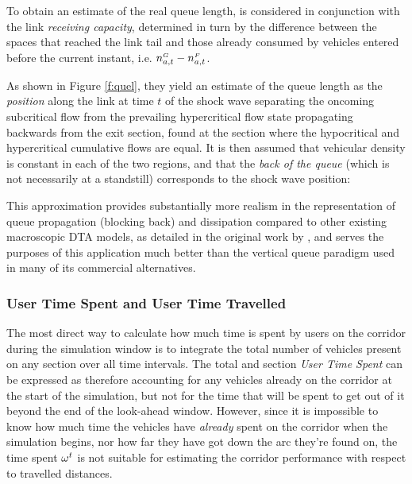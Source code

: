 To obtain an estimate of the real queue length,  is considered in conjunction with the link \emph{receiving capacity}, determined in turn by the difference between the spaces that reached the link tail and those already consumed by vehicles entered before the current instant, i.e. $n_{a,t}^{\scriptscriptstyle{G}} - n_{a,t}^{\scriptscriptstyle{F}}$. 


As shown in Figure \ref{f:quel}, they yield an estimate of the queue length as the \emph{position} along the link at time $t$ of the shock wave separating the oncoming subcritical flow from the prevailing hypercritical flow state propagating backwards from the exit section, found at the section where the hypocritical and hypercritical cumulative flows are equal. It is then assumed that vehicular density is constant in each of the two regions, and that the \emph{back of the queue} (which is not necessarily at a standstill) corresponds to the shock wave position:


This approximation provides substantially more realism in the representation of queue propagation (blocking back) and dissipation compared to other existing macroscopic DTA models, as detailed in the original work by \cite{yperman2007link}, and serves the purposes of this application much better than the vertical queue paradigm used in many of its commercial alternatives.


\subsubsection*{User Time Spent and User Time Travelled}
The most direct way to calculate how much time is spent by users on the corridor during the simulation window is to integrate the total number of vehicles present on any section over all time intervals. The total and section \emph{User Time Spent} can be expressed as
therefore accounting for any vehicles already on the corridor at the start of the simulation, but not for the time that will be spent to get out of it beyond the end of the look-ahead window.
However, since it is impossible to know how much time the vehicles have \emph{already} spent on the corridor when the simulation begins, nor how far they have got down the arc they're found on, the time spent $\omega_{}^{t}$ is not suitable for estimating the corridor performance with respect to travelled distances. 

